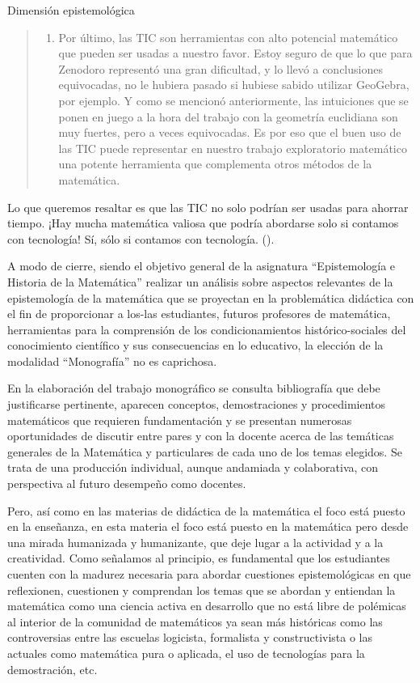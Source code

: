 Dimensión epistemológica

\vspace{1em}
\begin{quote}
	\begin{enumerate}[resume=isoper]
		\item Por último, las TIC son herramientas con alto potencial matemático que pueden ser usadas a nuestro favor. Estoy seguro de que lo que para Zenodoro representó una gran dificultad, y lo llevó a conclusiones equivocadas, no le hubiera pasado si hubiese sabido utilizar GeoGebra, por ejemplo. Y como se mencionó anteriormente, las intuiciones que se ponen en juego a la hora del trabajo con la geometría euclidiana son muy fuertes, pero a veces equivocadas. Es por eso que el buen uso de las TIC puede representar en nuestro trabajo exploratorio matemático una potente herramienta que complementa otros métodos de la matemática.
	\end{enumerate}
\end{quote}
\vspace{1em}

Lo que queremos resaltar es que las TIC no solo podrían ser usadas para ahorrar tiempo. ¡Hay mucha matemática valiosa que podría abordarse solo si contamos con tecnología! Sí, sólo si contamos con tecnología. (\textcite{rodriguez2017}).

\bigskip

A modo de cierre, siendo el objetivo general de la asignatura “Epistemología e Historia de la Matemática” realizar un análisis sobre aspectos relevantes de la epistemología de la matemática que se proyectan en la problemática didáctica con el fin de proporcionar a los-las estudiantes, futuros profesores de matemática, herramientas para la comprensión de los condicionamientos histórico-sociales del conocimiento científico y sus consecuencias en lo educativo, la elección de la modalidad “Monografía” no es caprichosa.

En la elaboración del trabajo monográfico se consulta bibliografía que debe justificarse pertinente, aparecen conceptos, demostraciones y procedimientos matemáticos que requieren fundamentación y se presentan numerosas oportunidades de discutir entre pares y con la docente acerca de las temáticas generales de la Matemática y particulares de cada uno de los temas elegidos. Se trata de una producción individual, aunque andamiada y colaborativa, con perspectiva al futuro desempeño como docentes.

Pero, así como en las materias de didáctica de la matemática el foco está puesto en la enseñanza, en esta materia el foco está puesto en la matemática pero desde una mirada humanizada y humanizante, que deje lugar a la actividad y a la creatividad. Como señalamos al principio, es fundamental que los estudiantes cuenten con la madurez necesaria para abordar cuestiones epistemológicas en que reflexionen, cuestionen y comprendan los temas que se abordan y entiendan la matemática como una ciencia activa en desarrollo que no está libre de polémicas al interior de la comunidad de matemáticos ya sean más históricas como las controversias entre las escuelas logicista, formalista y constructivista o las actuales como matemática pura o aplicada, el uso de tecnologías para la demostración, etc.

